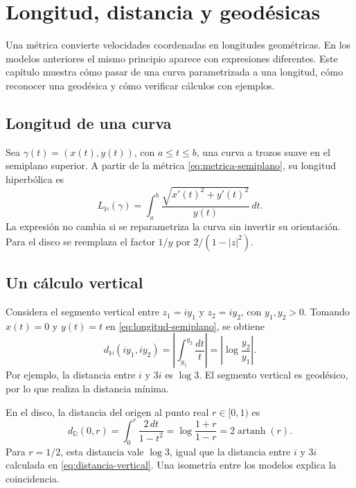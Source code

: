 \chapter{Longitud, distancia y geodésicas}
\label{cap:longitud-distancia}

Una métrica convierte velocidades coordenadas en longitudes geométricas. En los modelos anteriores el mismo principio aparece con expresiones diferentes. Este capítulo muestra cómo pasar de una curva parametrizada a una longitud, cómo reconocer una geodésica y cómo verificar cálculos con ejemplos.

\section{Longitud de una curva}

Sea \(\gamma(t)=(x(t),y(t))\), con \(a\leq t\leq b\), una curva a trozos suave en el semiplano superior. A partir de la métrica \cref{eq:metrica-semiplano}, su longitud hiperbólica es
\begin{equation}
  L_{\mathbb H}(\gamma)=\int_a^b
  \frac{\sqrt{x'(t)^2+y'(t)^2}}{y(t)}\,dt.
  \label{eq:longitud-semiplano}
\end{equation}
La expresión no cambia si se reparametriza la curva sin invertir su orientación. Para el disco se reemplaza el factor \(1/y\) por \(2/(1-|z|^2)\).

\section{Un cálculo vertical}

Considera el segmento vertical entre \(z_1=iy_1\) y \(z_2=iy_2\), con \(y_1,y_2>0\). Tomando \(x(t)=0\) y \(y(t)=t\) en \cref{eq:longitud-semiplano}, se obtiene
\begin{equation}
  d_{\mathbb H}(iy_1,iy_2)=\left|\int_{y_1}^{y_2}\frac{dt}{t}\right|
  =\left|\log\frac{y_2}{y_1}\right|.
  \label{eq:distancia-vertical}
\end{equation}
Por ejemplo, la distancia entre \(i\) y \(3i\) es \(\log 3\). El segmento vertical es geodésico, por lo que realiza la distancia mínima.

\begin{example}
En el disco, la distancia del origen al punto real \(r\in[0,1)\) es
\[
  d_{\mathbb D}(0,r)=\int_0^r\frac{2\,dt}{1-t^2}
  =\log\frac{1+r}{1-r}=2\operatorname{artanh}(r).
\]
Para \(r=1/2\), esta distancia vale \(\log 3\), igual que la distancia entre \(i\) y \(3i\) calculada en \cref{eq:distancia-vertical}. Una isometría entre los modelos explica la coincidencia.
\end{example}

